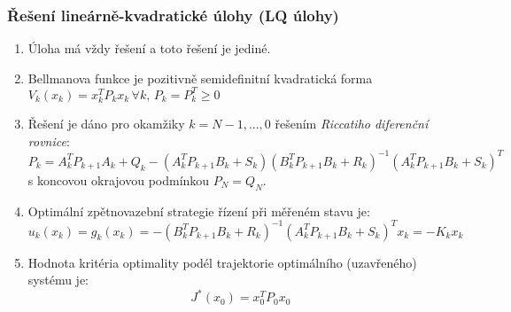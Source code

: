 \subsubsection*{Řešení lineárně-kvadratické úlohy (LQ úlohy)}
\begin{enumerate}
\item Úloha má vždy řešení a toto řešení je jediné.
\item Bellmanova funkce je pozitivně semidefinitní kvadratická forma $ V_k(x_k) = x_k^T P_k x_k \, \forall k, \, P_k = P_k^T \geq 0 $
\item Řešení je dáno pro okamžiky $ k = N-1,...,0 $ řešením \textit{Riccatiho diferenční rovnice}:
\begin{equation}
P_k = A_k^T P_{k+1} A_k + Q_k - (A_k^T P_{k+1} B_k + S_k)(B_k^T P_{k+1} B_k + R_k)^{-1}(A_k^T P_{k+1} B_k + S_k)^T
\end{equation}
s koncovou okrajovou podmínkou $ P_N = Q_N $.
\item Optimální zpětnovazební strategie řízení při měřeném stavu je:
\begin{equation*}
u_k(x_k) = g_k(x_k) = -(B_k^T P_{k+1} B_k + R_k)^{-1}(A_k^T P_{k+1} B_k + S_k)^T x_k = - K_k x_k
\end{equation*}
\item Hodnota kritéria optimality podél trajektorie optimálního (uzavřeného) systému je:
\begin{equation*}
J^*(x_0) = x_0^T P_0 x_0
\end{equation*}
\end{enumerate}

